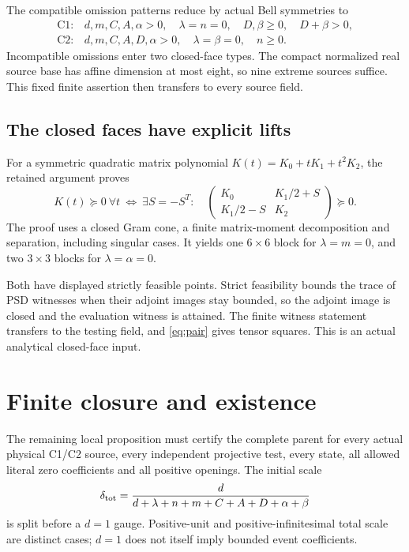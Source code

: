 The compatible omission patterns reduce by actual Bell symmetries to
\[
\begin{array}{ll}
\mathrm{C1}:&
 d,m,C,A,\alpha>0,\quad\lambda=n=0,\quad
 D,\beta\ge0,\quad D+\beta>0,\\
\mathrm{C2}:&
 d,m,C,A,D,\alpha>0,\quad\lambda=\beta=0,\quad n\ge0.
\end{array}
\]
Incompatible omissions enter two closed-face types.
The compact normalized real source base has affine dimension at most
eight, so nine extreme sources suffice. This fixed finite assertion
then transfers to every source field. 

\subsection{The closed faces have explicit lifts}

For a symmetric quadratic matrix polynomial \(K(t)=K_0+tK_1+t^2K_2\),
the retained argument proves
\[
 K(t)\succeq0\ \forall t
 \ \Longleftrightarrow\
 \exists S=-S^T:\quad
 \begin{pmatrix}K_0&K_1/2+S\\K_1/2-S&K_2\end{pmatrix}\succeq0.
\]
The proof uses a closed Gram cone, a finite matrix-moment decomposition
and separation, including singular cases.
It yields one \(6\times6\) block for \(\lambda=m=0\), and two
\(3\times3\) blocks for \(\lambda=\alpha=0\).

Both have displayed strictly feasible points. Strict feasibility bounds
the trace of PSD witnesses when their adjoint images stay bounded, so
the adjoint image is closed and the evaluation witness is attained.
The finite witness statement transfers to the testing field, and
\eqref{eq:pair} gives tensor squares. This is an actual analytical
closed-face input. \src{CF1--CF11; RFA}

\section{Finite closure and existence}

The remaining local proposition must certify the complete parent for
every actual physical C1/C2 source, every independent projective test,
every state, all allowed literal zero coefficients and all positive
openings. The initial scale
\[
 \delta_{\rm tot}=
 \frac{d}{d+\lambda+n+m+C+A+D+\alpha+\beta}
\]
is split before a \(d=1\) gauge. Positive-unit and positive-infinitesimal
total scale are distinct cases; \(d=1\) does not itself imply bounded
event coefficients.

